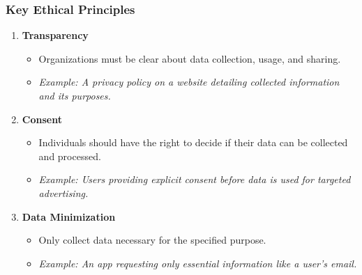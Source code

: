\documentclass[aspectratio=169]{beamer}
\begin{document}
\begin{frame}[fragile]
    \frametitle{Key Ethical Principles}
    \begin{enumerate}
        \item \textbf{Transparency}
        \begin{itemize}
            \item Organizations must be clear about data collection, usage, and sharing.
            \item \textit{Example: A privacy policy on a website detailing collected information and its purposes.}
        \end{itemize}
        
        \item \textbf{Consent}
        \begin{itemize}
            \item Individuals should have the right to decide if their data can be collected and processed.
            \item \textit{Example: Users providing explicit consent before data is used for targeted advertising.}
        \end{itemize}
        
        \item \textbf{Data Minimization}
        \begin{itemize}
            \item Only collect data necessary for the specified purpose.
            \item \textit{Example: An app requesting only essential information like a user's email.}
        \end{itemize}
    \end{enumerate}
\end{frame}
\end{document}
